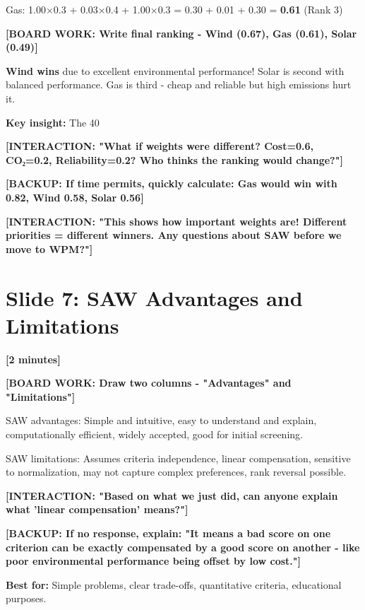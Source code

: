 \documentclass[12pt]{article}
\begin{document}
Gas: 1.00×0.3 + 0.03×0.4 + 1.00×0.3 = 0.30 + 0.01 + 0.30 = \textcolor{emphasis}{\textbf{0.61}} (Rank 3)

\textcolor{speakernote}{\textbf{[BOARD WORK: Write final ranking - Wind (0.67), Gas (0.61), Solar (0.49)]}}

\textcolor{emphasis}{\textbf{Wind wins}} due to excellent environmental performance! Solar is second with balanced performance. Gas is third - cheap and reliable but high emissions hurt it.

\textcolor{emphasis}{\textbf{Key insight:}} The 40%

\textcolor{speakernote}{\textbf{[INTERACTION: "What if weights were different? Cost=0.6, CO₂=0.2, Reliability=0.2? Who thinks the ranking would change?"]}}

\textcolor{speakernote}{\textbf{[BACKUP: If time permits, quickly calculate: Gas would win with 0.82, Wind 0.58, Solar 0.56]}}

\textcolor{speakernote}{\textbf{[INTERACTION: "This shows how important weights are! Different priorities = different winners. Any questions about SAW before we move to WPM?"]}}

\section*{Slide 7: SAW Advantages and Limitations}
\textcolor{timing}{\textbf{[2 minutes]}}

\textcolor{speakernote}{\textbf{[BOARD WORK: Draw two columns - "Advantages" and "Limitations"]}}

SAW advantages: Simple and intuitive, easy to understand and explain, computationally efficient, widely accepted, good for initial screening.

SAW limitations: Assumes criteria independence, linear compensation, sensitive to normalization, may not capture complex preferences, rank reversal possible.

\textcolor{speakernote}{\textbf{[INTERACTION: "Based on what we just did, can anyone explain what 'linear compensation' means?"]}}

\textcolor{speakernote}{\textbf{[BACKUP: If no response, explain: "It means a bad score on one criterion can be exactly compensated by a good score on another - like poor environmental performance being offset by low cost."]}}

\textcolor{emphasis}{\textbf{Best for:}} Simple problems, clear trade-offs, quantitative criteria, educational purposes.
\end{document}
